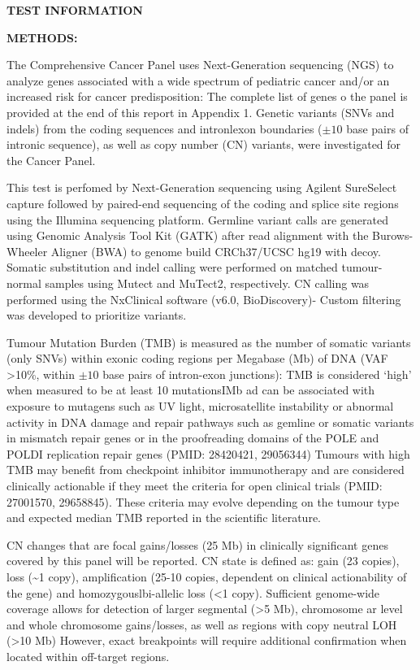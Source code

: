 \documentclass[8pt,letterpaper]{extarticle}
\newcommand{\data}[1]{}
\begin{document}
\vspace{2em}
{\small
{\bf TEST INFORMATION}

{\bf METHODS:}

The Comprehensive Cancer Panel uses Next-Generation sequencing (NGS) to analyze \data{num_tested_genes} genes associated with a wide spectrum of pediatric cancer and/or an increased risk for cancer predisposition: The complete list of genes o the panel is provided at the end of this report in Appendix 1. Genetic variants (SNVs and indels) from the coding sequences and intronlexon boundaries ($\pm 10$ base pairs of intronic sequence), as well as copy number (CN) variants, were investigated for the Cancer Panel.

This test is perfomed by Next-Generation sequencing using Agilent SureSelect capture followed by paired-end sequencing of the coding and splice site regions using the Illumina sequencing platform. Germline variant calls are generated using Genomic Analysis Tool Kit (GATK) after read alignment with the Burows-Wheeler Aligner (BWA) to genome build CRCh37/UCSC hg19 with decoy. Somatic substitution and indel calling were performed on matched tumour-normal samples using Mutect and MuTect2, respectively. CN calling was performed using the NxClinical software (v6.0, BioDiscovery)- Custom filtering was developed to prioritize variants. 

Tumour Mutation Burden (TMB) is measured as the number of somatic variants (only SNVs) within exonic coding regions per Megabase (Mb) of DNA (VAF >10\%, within $\pm 10$ base pairs of intron-exon junctions): TMB is considered `high' when measured to be at least 10 mutationsIMb ad can be associated with exposure to mutagens such as UV light, microsatellite instability or abnormal activity in DNA damage and repair pathways such as gemline or somatic variants in mismatch repair genes or in the proofreading domains of the POLE and POLDI replication repair genes (PMID: 28420421, 29056344) Tumours with high TMB may benefit from checkpoint inhibitor immunotherapy and are considered clinically actionable if they meet the criteria for open clinical trials (PMID: 27001570, 29658845). These criteria may evolve depending on the tumour type and expected median TMB reported in the scientific literature.

CN changes that are focal gains/losses (25 Mb) in clinically significant genes covered by this panel will be reported. CN state is defined as: gain (23 copies), loss (\textasciitilde 1 copy), amplification (25-10 copies, dependent on clinical actionability of the gene) and homozygouslbi-allelic loss (<1 copy). Sufficient genome-wide coverage allows for detection of larger segmental (>5 Mb), chromosome ar level and whole chromosome gains/losses, as well as regions with copy neutral LOH (>10 Mb)  However, exact breakpoints will require additional confirmation when located within off-target regions.

}
\end{document}
